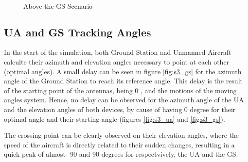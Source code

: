 \begin{figure}[H]
	\\
	\caption{Above the GS Scenario}
	\label{fig:s3_map}
\end{figure}

\subsection*{UA and GS Tracking Angles}
In the start of the simulation, both Ground Station and Unmanned Aircraft calculte their azimuth and elevation angles necessary to point at each other (optimal angles). A small delay can be seen in figure \ref{fig:s3_gs} for the azimuth angle of the Ground Station to reach its reference angle. This delay is the result of the starting point of the antennas, being 0$^{\circ}$, and the motions of the moving angles system. Hence, no delay can be observed for the azimuth angle of the UA and the elevation angles of both devices, by cause of having 0 degree for their optimal angle and their starting angle (figures \ref{fig:s3_ua} and \ref{fig:s3_gs}).

The crossing point can be clearly observed on their elevation angles, where the speed of the aircraft is directly related to their sudden changes, resulting in a quick peak of almost -90 and 90 degrees for respectvively, the UA and the GS. 

